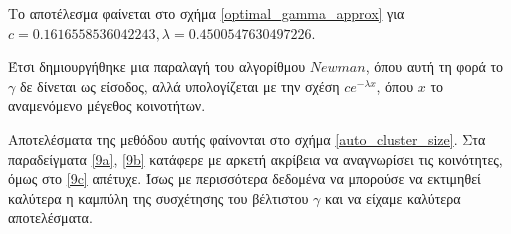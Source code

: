 \documentclass[12pt, letterpaper]{article}
\begin{document}
Το αποτέλεσμα φαίνεται στο σχήμα \ref{optimal_gamma_approx} για $c = 0.1616558536042243, \lambda = 0.4500547630497226$.

Έτσι δημιουργήθηκε μια παραλαγή του αλγορίθμου $Newman$, όπου αυτή τη φορά 
το $\gamma$ δε δίνεται ως είσοδος, αλλά υπολογίζεται με την σχέση $ce^{-\lambda x}$,
όπου $x$ το αναμενόμενο μέγεθος κοινοτήτων.

Αποτελέσματα της μεθόδου αυτής φαίνονται στο σχήμα \ref{auto_cluster_size}.
Στα παραδείγματα \ref{9a}, \ref{9b} κατάφερε με αρκετή ακρίβεια να αναγνωρίσει 
τις κοινότητες, όμως στο \ref{9c} απέτυχε. Ίσως με περισσότερα δεδομένα 
να μπορούσε να εκτιμηθεί καλύτερα η καμπύλη της συσχέτησης του βέλτιστου $\gamma$
και να είχαμε καλύτερα αποτελέσματα. 
\end{document}
